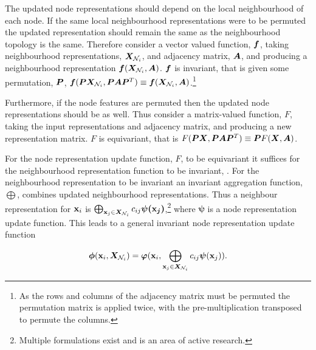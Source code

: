 

The updated node representations should depend on the local neighbourhood of each node.
If the same local neighbourhood representations were to be permuted the updated representation should remain the same as the neighbourhood topology is the same.
Therefore consider a vector valued function, ${\bm{f}}$, taking neighbourhood representations, ${\bm{X}}_{{\mathcal{N}}_i}$, and adjacency matrix, ${\bm{A}}$, and producing a neighbourhood representation ${\bm{f}}({\bm{X}}_{{\mathcal{N}}_i}, {\bm{A}})$.
${\bm{f}}$ is invariant, that is given some permutation, ${\bm{P}}$, ${\bm{f}}({\bm{P}}{\bm{X}}_{{\mathcal{N}}_i}, {\bm{P}}{\bm{A}}{\bm{P}}^T) \equiv {\bm{f}}({\bm{X}}_{{\mathcal{N}}_i}, {\bm{A}})$.\footnote{As the rows and columns of the adjacency matrix must be permuted the permutation matrix is applied twice, with the pre-multiplication transposed to permute the columns.}

Furthermore, if the node features are permuted then the updated node representations should be as well.
Thus consider a matrix-valued function, $F$, taking the input representations and adjacency matrix, and producing a new representation matrix.
$F$ is equivariant, that is $F({\bm{P}}{\bm{X}}, {\bm{P}}{\bm{A}}{\bm{P}}^T) \equiv {\bm{P}} F({\bm{X}}, {\bm{A}})$.

For the node representation update function, $F$, to be equivariant it suffices for the neighbourhood representation function to be invariant, .
For the neighbourhood representation to be invariant an invariant aggregation function, $\bigoplus$, combines updated neighbourhood representations.
Thus a neighbour representation for ${\textbf{x}}_i$ is $\bigoplus_{{\textbf{x}}_j \in {\bm{X}}_{{\mathcal{N}}_i}}c_{ij}\bm{\psi({\textbf{x}}_j)}$,\footnote{Multiple formulations exist and is an area of active research.}
where $\bm{\psi}$ is a node representation update function.
This leads to a general invariant node representation update function

\begin{equation}
    \label{eq:conv-def}
    \bm{\phi}({\textbf{x}}_i, {\bm{X}}_{{\mathcal{N}}_i}) = \bm{\varphi}({\textbf{x}}_i, \bigoplus_{{\textbf{x}}_j \in {\bm{X}}_{{\mathcal{N}}_i}}c_{ij}\bm{\psi}({\textbf{x}}_j)).
\end{equation}


